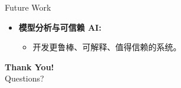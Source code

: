 \documentclass{beamer}
\begin{document}
\begin{CJK}{UTF8}{gbsn}
\begin{frame}{Future Work}
\begin{itemize}
        \item \textbf{模型分析与可信赖 AI:}
        \begin{itemize}
            \item 开发更鲁棒、可解释、值得信赖的系统。
        \end{itemize}
    \end{itemize}
\end{frame}

\begin{frame}
  \begin{center}
    \Huge \textbf{Thank You!}
    \\[2em]
    \Large Questions?
  \end{center}
\end{frame}


\end{CJK}
\end{document}
